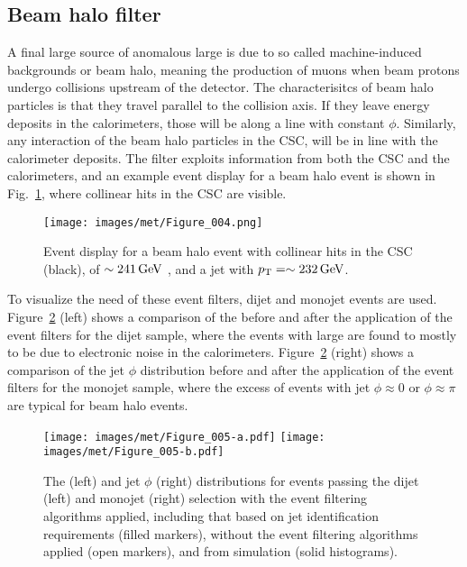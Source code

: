 \subsection*{Beam halo filter}
\noindent
\justify
A final large source of anomalous large \ptmiss is due to so called machine-induced backgrounds or beam halo, meaning the production of muons when beam protons undergo collisions upstream of the detector. 
The characterisitcs of beam halo particles is that they travel parallel to the collision axis. 
If they leave energy deposits in the calorimeters, those will be along a line with constant $\phi$. 
Similarly, any interaction of the beam halo particles in the CSC, will be in line with the calorimeter deposits.  
The filter exploits information from both the CSC and the calorimeters, and an example event display for a beam halo event is shown in Fig.~\ref{fig:beamhalo}, where collinear hits in the CSC are visible. 
\begin{figure}[!htp]
\centering
\texttt{[image: images/met/Figure\_004.png]}
\caption{Event display for a beam halo event with collinear hits in the CSC (black), \ptmiss of $\sim241\,\text{Ge\hspace{-.08em}V}$ , and a jet with $p_{\mathrm{T}}=\sim232\,\text{Ge\hspace{-.08em}V}$.}
\label{fig:beamhalo}
\end{figure}
To visualize the need of these event filters, dijet and monojet events are used. 
Figure~\ref{fig:dijet} (left) shows a comparison of the \ptmiss before and after the application of the event filters for the dijet sample, where the events with large \ptmiss are found to mostly to be due to electronic noise in the calorimeters.
Figure~\ref{fig:dijet} (right) shows a comparison of the jet $\phi$ distribution before and after the application of the event filters for the monojet sample, where the excess of events with jet $\phi\approx 0$ or $\phi\approx\pi$ are typical for beam halo events. 
\begin{figure}[!htp]
\centering
\texttt{[image: images/met/Figure\_005-a.pdf]}
\texttt{[image: images/met/Figure\_005-b.pdf]}
\caption{The \ptmiss (left) and jet $\phi$ (right) distributions for events passing the dijet (left) and monojet (right) selection with the event filtering algorithms applied, including that based
on jet identification requirements (filled markers), without the event filtering algorithms applied (open markers), and from simulation (solid histograms). }
\label{fig:dijet}
\end{figure}                                                                                                                                                                                    
